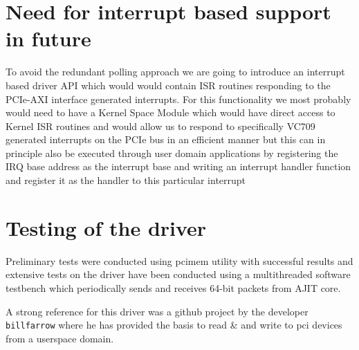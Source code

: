 \section{Need for interrupt based support in future}

To avoid the redundant polling approach we are going to introduce an interrupt based driver API which would would contain ISR routines
responding to the PCIe-AXI interface generated interrupts. For this functionality we most probably would need to have a Kernel Space
Module which would have direct access to Kernel ISR routines and would allow us to respond to specifically VC709 generated interrupts on
the PCIe bus in an efficient manner but this can in principle also be executed through user domain applications by registering the IRQ base
address as the interrupt base and writing an interrupt handler function and register it as the handler to this particular interrupt 

\section{Testing of the driver}

Preliminary tests were conducted using pcimem utility with successful results and extensive tests on the driver have been conducted using a
multithreaded software testbench which periodically sends and receives 64-bit packets from AJIT core.

\begin{displayquote}
A strong reference for this driver was a github project by the developer \verb|billfarrow| where he has provided the basis to read \& and write to
pci devices from a userspace domain.
\end{displayquote}

